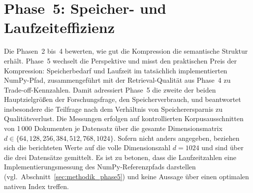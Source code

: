 \section{Phase~5: Speicher- und Laufzeiteffizienz}
\label{sec:ergebnisse_phase5}
%
Die Phasen~2 bis~4 bewerten, wie gut die Kompression die semantische Struktur erhält.
Phase~5 wechselt die Perspektive und misst den praktischen Preis der Kompression: Speicherbedarf und Laufzeit im tatsächlich implementierten NumPy-Pfad, zusammengeführt mit der Retrieval-Qualität aus Phase~4 zu Trade-off-Kennzahlen.
Damit adressiert Phase~5 die zweite der beiden Hauptzielgrößen der Forschungsfrage, den Speicherverbrauch, und beantwortet insbesondere die Teilfrage nach dem Verhältnis von Speicherersparnis zu Qualitätsverlust.
Die Messungen erfolgen auf kontrollierten Korpusausschnitten von 1\,000 Dokumenten je Datensatz über die gesamte Dimensionsmatrix $d \in \{64, 128, 256, 384, 512, 768, 1024\}$.
Sofern nicht anders angegeben, beziehen sich die berichteten Werte auf die volle Dimensionszahl $d = 1024$ und sind über die drei Datensätze gemittelt.
Es ist zu betonen, dass die Laufzeitzahlen eine Implementierungsmessung des NumPy-Referenzpfads darstellen (vgl.\ Abschnitt~\ref{sec:methodik_phase5}) und keine Aussage über einen optimalen nativen Index treffen.
%
